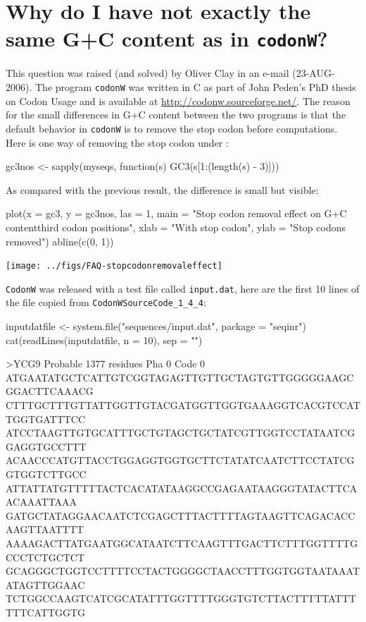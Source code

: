 \documentclass{article}
\begin{document}
\section{Why do I have not exactly the same G+C content as in \texttt{codonW}?}

This question was raised (and solved) by Oliver Clay in an e-mail (23-AUG-2006).
The program \texttt{codonW} was written in C as part of John Peden's PhD thesis 
on Codon Usage \cite{codonW} and is available at \url{http://codonw.sourceforge.net/}.
The reason for the small differences in G+C content between the two programs is
that the default behavior in \texttt{codonW} is to remove the stop codon before
computations. Here is one way of removing the stop codon under \Rlogo{}:

\begin{Schunk}
\begin{Sinput}
 gc3nos <- sapply(myseqs, function(s) GC3(s[1:(length(s) - 
     3)]))
\end{Sinput}
\end{Schunk}

As compared with the previous result, the difference is small but visible:

\begin{Schunk}
\begin{Sinput}
 plot(x = gc3, y = gc3nos, las = 1, main = "Stop codon removal effect on G+C content\nin third codon positions", 
     xlab = "With stop codon", ylab = "Stop codons removed")
 abline(c(0, 1))
\end{Sinput}
\end{Schunk}
\texttt{[image: ../figs/FAQ-stopcodonremovaleffect]}

\texttt{CodonW} was released with a test file called \texttt{input.dat}, here are
the first 10 lines of the file copied from \texttt{CodonWSourceCode\_1\_4\_4}:

\begin{Schunk}
\begin{Sinput}
 inputdatfile <- system.file("sequences/input.dat", package = "seqinr")
 cat(readLines(inputdatfile, n = 10), sep = "\n")
\end{Sinput}
\begin{Soutput}
>YCG9 Probable          1377 residues Pha 0 Code 0
ATGAATATGCTCATTGTCGGTAGAGTTGTTGCTAGTGTTGGGGGAAGCGGACTTCAAACG
CTTTGCTTTGTTATTGGTTGTACGATGGTTGGTGAAAGGTCACGTCCATTGGTGATTTCC
ATCCTAAGTTGTGCATTTGCTGTAGCTGCTATCGTTGGTCCTATAATCGGAGGTGCCTTT
ACAACCCATGTTACCTGGAGGTGGTGCTTCTATATCAATCTTCCTATCGGTGGTCTTGCC
ATTATTATGTTTTTACTCACATATAAGGCCGAGAATAAGGGTATACTTCAACAAATTAAA
GATGCTATAGGAACAATCTCGAGCTTTACTTTTAGTAAGTTCAGACACCAAGTTAATTTT
AAAAGACTTATGAATGGCATAATCTTCAAGTTTGACTTCTTTGGTTTTGCCCTCTGCTCT
GCAGGGCTGGTCCTTTTCCTACTGGGGCTAACCTTTGGTGGTAATAAATATAGTTGGAAC
TCTGGCCAAGTCATCGCATATTTGGTTTTGGGTGTCTTACTTTTTATTTTTTCATTGGTG
\end{Soutput}
\end{Schunk}
\end{document}
